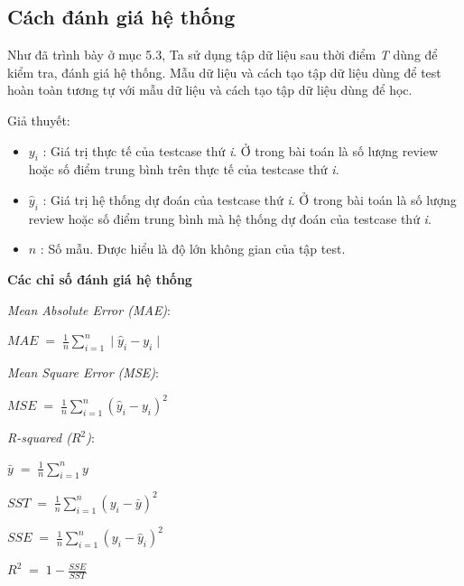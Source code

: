 \documentclass[12pt]{extarticle}
\begin{document}
		\subsection{Cách đánh giá hệ thống}
			\par Như đã trình bày ở mục 5.3, Ta sử dụng tập dữ liệu sau thời điểm \textit{T} dùng để kiểm tra, đánh giá hệ thống. Mẫu dữ liệu và cách tạo tập dữ liệu dùng để test hoàn toàn tương tự với mẫu dữ liệu và cách tạo tập dữ liệu dùng để học.
			\par Giả thuyết:
			 \begin{itemize}
				\item $y_{i}$ : Giá trị thực tế của testcase thứ  \textit{i}. Ở trong bài toán là số lượng review hoặc số điểm trung bình trên thực tế của testcase thứ  \textit{i}.
				\item $\hat{y}_{i}$ : Giá trị hệ thống dự đoán của testcase thứ  \textit{i}. Ở trong bài toán là số lượng review hoặc số điểm trung bình mà hệ thống dự đoán của testcase thứ  \textit{i}.
				\item $n$ : Số mẫu. Được hiểu là độ lớn không gian của tập test.
			\end{itemize}
			\par \textbf{Các chỉ số đánh giá hệ thống}
			\par \textit{Mean Absolute Error (MAE)}: 
				\large
				\begin{center}
					$MAE\;=\;\frac{1}{n}\sum_{i=1}^n\mid \hat{y}_{i}-y_{i}\mid$
				\end{center}
				\normalsize
			\par \textit{Mean Square Error (MSE)}:
				\large
				\begin{center}
					$MSE\;=\;\frac{1}{n}\sum_{i=1}^n(\hat{y}_{i}-y_{i})^{2}$
				\end{center}
				\normalsize
			\par \textit{R-squared ($R^{2}$)}:
				\large
				\begin{center}
					\par $\bar{y}\;=\;\frac{1}{n}\sum_{i=1}^ny$
					\par $SST\;=\;\frac{1}{n}\sum_{i=1}^n(y_{i}-\bar{y})^{2}$
					\par $SSE\;=\;\frac{1}{n}\sum_{i=1}^n(y_{i}-\hat{y}_{i})^{2}$
					\par $R^{2}\;=\;1-\frac{SSE}{SST}$
				\end{center}
				\normalsize
\end{document}
